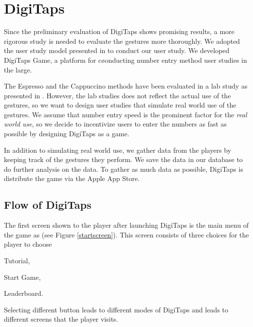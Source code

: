 \section{DigiTaps}
\label{sec:digitaps}

Since the preliminary evaluation of DigiTaps shows promising results, a more rigorous study is needed to evaluate the gestures more thoroughly. We adopted the user study model presented in \cite{Henze:2011} to conduct our user study. We developed DigiTaps Game, a platform for cøonducting number entry method user studies in the large.
\par
The Espresso and the Cappuccino methods have been evaluated in a lab study as presented in \cite{Azenkot:2013}. However, the lab studies does not reflect the actual use of the gestures, so we want to design user studies that simulate real world use of the gestures. We assume that number entry speed is the prominent factor for the \textit{real world use}, so we decide to incentivize users to enter the numbers as fast as possible by designing DigiTaps as a game.
\par
In addition to simulating real world use, we gather data from the players by keeping track of the gestures they perform. We save the data in our database to do further analysis on the data. To gather as much data as possible, DigiTaps is distribute the game via the Apple App Store.

\subsection{Flow of DigiTaps}
The first screen shown to the player after launching DigiTaps is the main menu of the game as (see Figure \ref{startscreen}). This screen consists of three choices for the player to choose
  \begin{enumerate*}[(1) ]
    \item Tutorial, 
    \item Start Game, 
    \item Leaderboard.
  \end{enumerate*}
  Selecting different button leads to different modes of DigiTaps and leads to different screens that the player visits.
  
